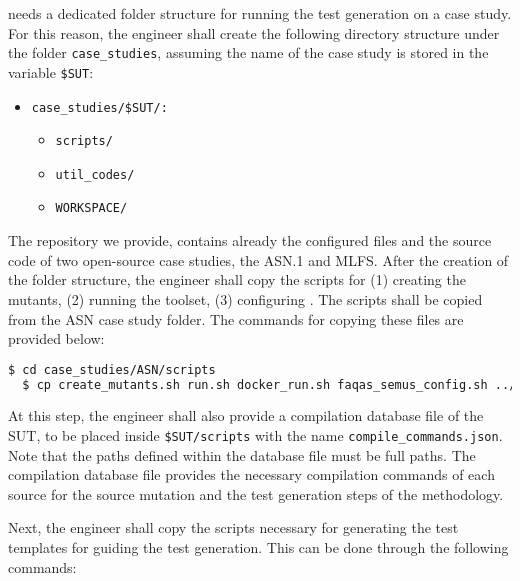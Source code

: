 
\SEMUS needs a dedicated folder structure for running the test generation on a case study. 
For this reason, the engineer shall create the following directory structure under the folder \texttt{case\_studies}, assuming the name of the case study is stored in the variable \texttt{\$SUT}:

\begin{itemize}
	\item \texttt{case\_studies/\$SUT/:}
	\begin{itemize}
		\item \texttt{scripts/}
		\item \texttt{util\_codes/}
		\item \texttt{WORKSPACE/}
	\end{itemize}
\end{itemize}

The \SEMUS repository we provide, contains already the configured files and the source code of two open-source case studies, the ASN.1 and MLFS.
After the creation of the folder structure, the engineer shall copy the scripts for (1) creating the mutants, (2) running the toolset, (3) configuring \SEMUS. The scripts shall be copied from the ASN case study folder. The commands for copying these files are provided below:

\begin{lstlisting}[language=bash]
  $ cd case_studies/ASN/scripts
  $ cp create_mutants.sh run.sh docker_run.sh faqas_semus_config.sh ../../$SUT/scripts
\end{lstlisting}

At this step, the engineer shall also provide a compilation database file of the SUT, to be placed inside \texttt{\$SUT/scripts} with the name \texttt{compile\_commands.json}. Note that the paths defined within the database file must be full paths. The compilation database file provides the necessary compilation commands of each source for the source mutation and the test generation steps of the methodology.

Next, the engineer shall copy the scripts necessary for generating the test templates for guiding the test generation. This can be done through the following commands:

